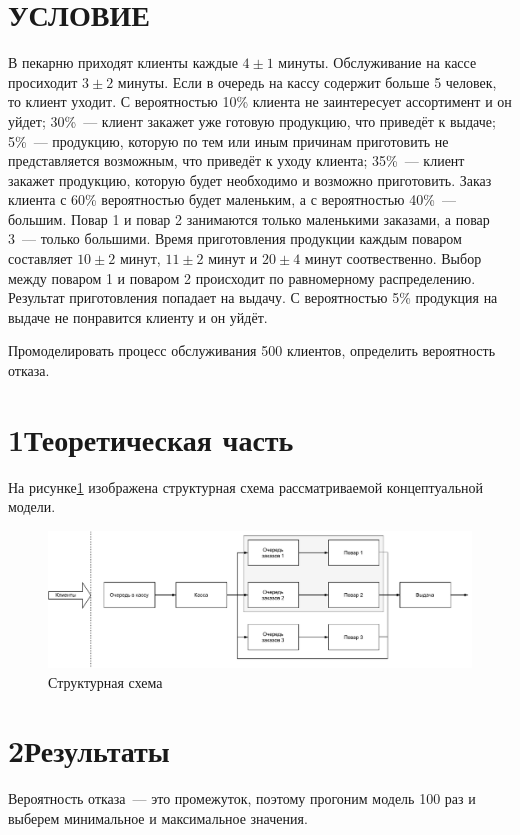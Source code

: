 \section*{\hfill{}УСЛОВИЕ\hfill{}}
В пекарню приходят клиенты каждые $4\pm1$ минуты. Обслуживание на кассе просиходит $3\pm2$ минуты. Если в очередь на кассу содержит больше 5 человек, то клиент уходит. С вероятностью 10\% клиента не заинтересует ассортимент и он уйдет; 30\%~--- клиент закажет уже готовую продукцию, что приведёт к выдаче; 5\%~--- продукцию, которую по тем или иным причинам приготовить не представляется возможным, что приведёт к уходу клиента; 35\%~--- клиент закажет продукцию, которую будет необходимо и возможно приготовить. Заказ клиента с 60\% вероятностью будет маленьким, а с вероятностью 40\%~--- большим. Повар 1 и повар 2 занимаются только маленькими заказами, а повар 3~--- только большими. Время приготовления продукции каждым поваром составляет $10\pm2$ минут, $11\pm2$ минут и $20\pm4$ минут соотвественно. Выбор между поваром 1 и поваром 2 происходит по равномерному распределению. Результат приготовления попадает на выдачу. С вероятностью 5\% продукция на выдаче не понравится клиенту и он уйдёт.

Промоделировать процесс обслуживания 500 клиентов, определить вероятность отказа.

\section*{\hspace{1.25cm}1\quad{}Теоретическая часть}
На рисунке\ref{img:concept} изображена структурная схема рассматриваемой концептуальной модели.
\begin{figure}[H]
    \centering
    \includegraphics[width=1\textwidth]{pdf/concept.pdf}
    \caption{Структурная схема}
    \label{img:concept}
\end{figure}

\section*{\hspace{1.25cm}2\quad{}Результаты}
Вероятность отказа~--- это промежуток, поэтому прогоним модель 100 раз и выберем минимальное и максимальное значения.

